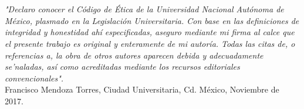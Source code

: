 \chapter*{}
\begin{flushright}

\textit{"Declaro conocer el C\'odigo de \'Etica de la Universidad Nacional Aut\'onoma de M\'exico, plasmado en la Legislaci\'on Universitaria.
    Con base en las definiciones de integridad y honestidad  ah\'i especificadas, aseguro mediante mi firma al calce que el presente trabajo  es original y enteramente de mi autor\'ia.
    Todas las citas de, o referencias a, la obra de otros autores aparecen debida y adecuadamente se'naladas, as\'i como acreditadas mediante los recursos editoriales convencionales".}\\[10 cm]

Francisco Mendoza Torres, Ciudad Universitaria, Cd. M\'exico, Noviembre de 2017.

\end{flushright}

